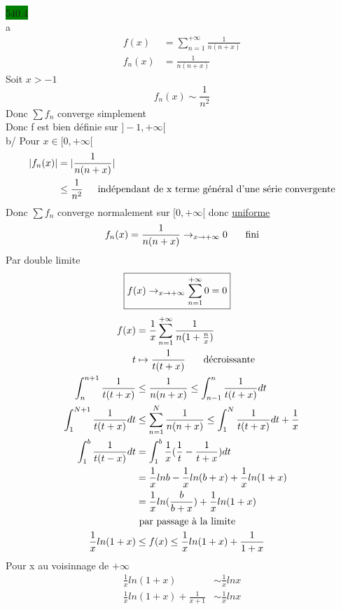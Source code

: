 \documentclass{article}
\begin{document}
\noindent \colorbox{green}{540.4}\\
a \begin{align*}
    f(x) &= \sum_{n=1}^{+\infty}\frac{1}{n(n+x)}\\
    f_n(x) &= \frac{1}{n(n+x)}
\end{align*}
Soit \(x>-1\)\begin{equation*}
    f_n(x) \sim \frac{1}{n^2}   
\end{equation*}
Donc \(\sum f_n\) converge simplement\\
Donc f est bien définie sur \(]-1, +\infty[\)\\
b/ Pour \(x \in [0, +\infty[\)\begin{align*}
    |f_n(x)| &= |\frac{1}{n(n+x)}|\\
    &\leq \frac{1}{n^2} \indent \text{indépendant de x terme général d'une série convergente}
\end{align*}
Donc \(\sum f_n\) converge normalement sur \([0, +\infty[\) donc \underline{uniforme}\\
\begin{equation*}
    f_n(x) = \frac{1}{n(n+x)} \rightarrow_{x\to +\infty} 0 \indent \text{ fini}
\end{equation*}
Par double limite \begin{align*}
    \Aboxed{f(x) \rightarrow_{x\to +\infty} \sum_{n=1}^{+\infty} 0 = 0}
\end{align*}
\begin{align*}
    f(x) &= \frac{1}{x}\sum_{n=1}^{+\infty}\frac{1}{n(1+\frac{n}{x})}\\
    t &\mapsto \frac{1}{t(t+x)} \indent \text{ décroissante}\\
    \int_{n}^{n+1} \frac{1}{t(t+x)} &\leq \frac{1}{n(n+x)} \leq \int_{n-1}^{n} \frac{1}{t(t+x)} dt\\
    \int_{1}^{N+1} \frac{1}{t(t+x)} dt &\leq \sum_{n=1}^{N} \frac{1}{n(n+x)} \leq \int_{1}^{N} \frac{1}{t(t+x)} dt + \frac{1}{x}\\
    \int_{1}^{b} \frac{1}{t(t-x)} dt &= \int_{1}^{b} \frac{1}{x}(\frac{1}{t}-\frac{1}{t+x}) dt \\
    &= \frac{1}{x}lnb - \frac{1}{x} ln(b+x) + \frac{1}{x} ln(1+x)\\
    &= \frac{1}{x}ln(\frac{b}{b+x}) + \frac{1}{x}ln(1+x)\\
    &\text{ par passage à la limite}\\
    \frac{1}{x}ln(1+x) &\leq f(x) \leq \frac{1}{x}ln(1+x) + \frac{1}{1+x}
\end{align*}
Pour x au voisinnage de \(+\infty\)\begin{align*}
    \frac{1}{x}ln(1+x) &\sim \frac{1}{x}lnx\\
    \frac{1}{x}ln(1+x) + \frac{1}{x+1} &\sim \frac{1}{x} lnx
\end{align*}
\end{document}
